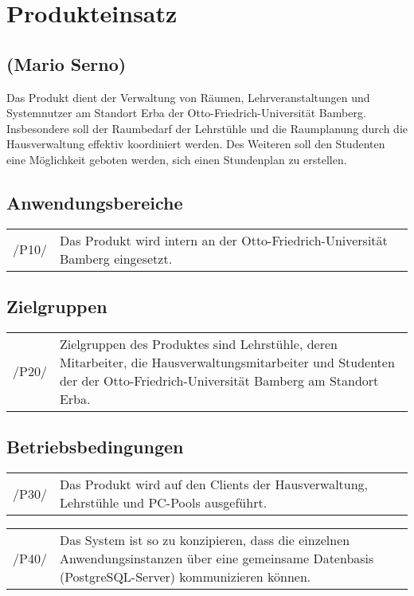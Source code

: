 \section{Produkteinsatz}
\label{sec:Produkteinsatz}

\subsection*{(Mario Serno)}

Das Produkt dient der Verwaltung von Räumen, Lehrveranstaltungen und Systemnutzer am Standort Erba der Otto-Friedrich-Universität Bamberg. Insbesondere soll der Raumbedarf der Lehrstühle und die Raumplanung durch die Hausverwaltung effektiv koordiniert werden. Des Weiteren soll den Studenten eine Möglichkeit geboten werden, sich einen Stundenplan zu erstellen.

\subsection{Anwendungsbereiche}
\begin{tabular}{p{1.5cm}p{14.5cm}}	
	 /P10/& Das Produkt wird intern an der Otto-Friedrich-Universität Bamberg eingesetzt. \\[0.25cm]
\end{tabular}


\subsection{Zielgruppen}
\begin{tabular}{p{1.5cm}p{14.5cm}}	
	 /P20/& Zielgruppen des Produktes sind Lehrstühle, deren Mitarbeiter, die Hausverwaltungsmitarbeiter und Studenten der der Otto-Friedrich-Universität Bamberg am Standort Erba. \\[0.25cm]
\end{tabular}


\subsection{Betriebsbedingungen}
\begin{tabular}{p{1.5cm}p{14.5cm}}	
	 /P30/& Das Produkt wird auf den Clients der Hausverwaltung, Lehrstühle und PC-Pools ausgeführt. \\[0.25cm]
\end{tabular}

\begin{tabular}{p{1.5cm}p{14.5cm}}	
	 /P40/& Das System ist so zu konzipieren, dass die einzelnen Anwendungsinstanzen über eine gemeinsame Datenbasis (PostgreSQL-Server) kommunizieren können. \\[0.25cm]
\end{tabular}

